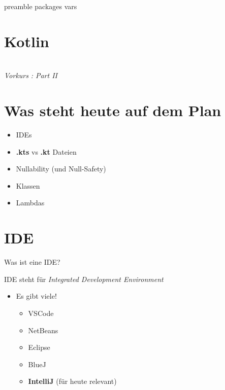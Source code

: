 \RequirePackage{import}
{preamble}
{packages}
{vars}

    \section{Kotlin}\label{sec:kotlin}
    \begin{frame}[c]
        \centering
        \Large
        
        \\
        \pause
        \textit{Vorkurs}
        \pause
        \textit{: Part II}
    \end{frame}


    \section{Was steht heute auf dem Plan}\label{sec:plan}
    \begin{frame}[c]
        \slidehead
        \begin{itemize}
            \item IDEs
            \item \textbf{.kts} vs \textbf{.kt} Dateien
            \item Nullability (und Null-Safety)
            \item Klassen
            \item Lambdas
        \end{itemize}
    \end{frame}


    \section{IDE}\label{sec:ide}
    \begin{frame}[c]
        \slidehead
        \Large
        \centering
        Was ist eine IDE?
    \end{frame}

    \begin{frame}[c]
        \slidehead
        IDE steht für \textit{Integrated Development Environment}
        \pause
        \begin{itemize}
            [<+->]
            \item Es gibt viele!
            \begin{itemize}
                \item VSCode
                \item NetBeans
                \item Eclipse
                \item BlueJ
                \item \textbf{IntelliJ} (für heute relevant)
            \end{itemize}
        \end{itemize}
    \end{frame}

